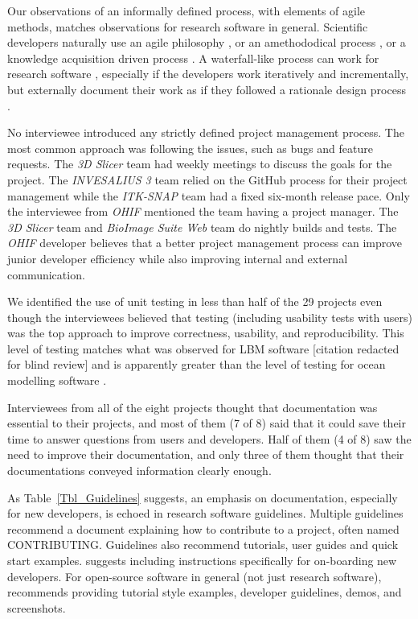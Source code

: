 \documentclass[final, 12pt, 3p, times]{elsarticle}
\begin{document}
Our observations of an informally defined process, with elements of agile
methods, matches observations for research software in general.
Scientific developers naturally use an agile philosophy \cite{AckroydEtAl2008,
CarverEtAl2007, EasterbrookAndJohns2009, Segal2005, HeatonAndCarver2015}, or an
amethododical process \cite{Kelly2013}, or a knowledge acquisition driven
process \cite{Kelly2015}.  A waterfall-like process can work for research
software \cite{Smith2016}, especially if the developers work iteratively and
incrementally, but externally document their work as if they followed a
rationale design process \cite{parnas1986rational}.

No interviewee introduced any strictly defined project management process. The
most common approach was following the issues, such as bugs and feature
requests. The \textit{3D Slicer} team had weekly meetings to
discuss the goals for the project. The \textit{INVESALIUS 3} team relied on the
GitHub process for their project management while the \textit{ITK-SNAP} team had a
fixed six-month release pace. Only the interviewee from \textit{OHIF} 
mentioned the team having a project manager. The \textit{3D Slicer} team and
\textit{BioImage Suite Web} team do nightly builds and tests. The \textit{OHIF}
developer believes that a better project management process can improve junior
developer efficiency while also improving internal and external communication.

We identified the use of unit testing in less than half of the 29 projects even
though the interviewees believed that testing (including usability tests with
users) was the top approach to improve correctness, usability, and
reproducibility.  This level of testing matches what was observed for LBM
software [citation redacted for blind review]
and is apparently greater than the level of
testing for ocean modelling software \cite{JungEtAl2022}.

Interviewees from all of the eight projects thought that documentation was
essential to their projects, and most of them (7 of 8) said that it could save
their time to answer questions from users and developers. Half of them (4 of 8)
saw the need to improve their documentation, and only three of them thought that
their documentations conveyed information clearly enough.

As Table~\ref{Tbl_Guidelines} suggests, an emphasis on documentation, especially
for new developers, is echoed in research software guidelines. Multiple
guidelines recommend a document explaining how to contribute to a project, often
named CONTRIBUTING. Guidelines also recommend tutorials, user guides and quick
start examples. \cite{SmithAndRoscoe2018} suggests including instructions
specifically for on-boarding new developers. For open-source software in general
(not just research software), \cite{Fogel2005} recommends providing tutorial
style examples, developer guidelines, demos, and screenshots.
\end{document}
